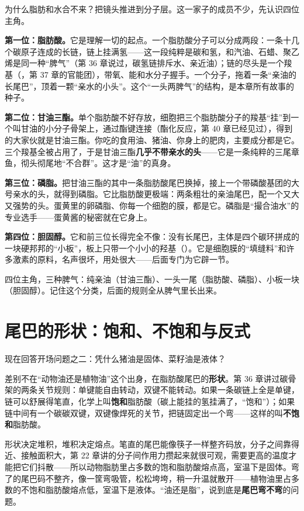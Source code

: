 为什么脂肪和水合不来？把镜头推进到分子层。这一家子的成员不少，先认识四位主角。

\textbf{第一位：脂肪酸。}它是理解一切的起点。一个脂肪酸分子可以分成两段：一条十几个碳原子连成的长链，链上挂满氢——这一段纯粹是碳和氢，和汽油、石蜡、聚乙烯是同一种“脾气”（第 36 章说过，碳氢链排斥水、亲近油）；链的尽头是一个羧基（，第 37 章的官能团），带氧、能和水分子握手。一个分子，拖着一条“亲油的长尾巴”，顶着一颗“亲水的小头”。这个“一头两脾气”的结构，是本章所有故事的种子。

\textbf{第二位：甘油三酯。}单个脂肪酸不好存放，细胞把三个脂肪酸分子的羧基“挂”到一个叫甘油的小分子骨架上，通过酯键连接（酯化反应，第 40 章已经见过），得到的大家伙就是甘油三酯。你吃的食用油、猪油、你身上的肥肉，主要成分都是它。三个羧基全被占用了，于是甘油三酯\textbf{几乎不带亲水的头}——它是一条纯粹的三尾章鱼，彻头彻尾地“不合群”。这才是“油”的真身。

\textbf{第三位：磷脂。}把甘油三酯的其中一条脂肪酸尾巴换掉，接上一个带磷酸基团的大号亲水的头，就得到磷脂。它比脂肪酸更极端：两条粗壮的亲油尾巴，配一个又大又强势的头。蛋黄里的卵磷脂、你每一个细胞的膜，都是它。磷脂是“撮合油水”的专业选手——蛋黄酱的秘密就在它身上。

\textbf{第四位：胆固醇。}它和前三位长得完全不像：没有长尾巴，主体是四个碳环拼成的一块硬邦邦的“小板”，板上只带一个小小的羟基（）。它是细胞膜的“填缝料”和许多激素的原料，名声很坏，用处很大——后面专门为它辟一节。

四位主角，三种脾气：纯亲油（甘油三酯）、一头一尾（脂肪酸、磷脂）、小板一块（胆固醇）。记住这个分类，后面的规则全从脾气里长出来。

\section{尾巴的形状：饱和、不饱和与反式}

现在回答开场问题之二：凭什么猪油是固体、菜籽油是液体？

差别不在“动物油还是植物油”这个出身，在脂肪酸尾巴的\textbf{形状}。第 36 章讲过碳骨架的两条关节规则：单键能自由转动，双键不能转动。如果一条碳链上全是单键，链可以舒展得笔直，化学上叫\textbf{饱和}脂肪酸（碳上能挂的氢挂满了，“饱和”）；如果链中间有一个碳碳双键，双键像焊死的关节，把链固定出一个弯——这样的叫\textbf{不饱和}脂肪酸。

形状决定堆积，堆积决定熔点。笔直的尾巴能像筷子一样整齐码放，分子之间靠得近、接触面积大，第 22 章讲的分子间作用力攒起来就很可观，需要更高的温度才能把它们抖散——所以动物脂肪里占多数的饱和脂肪酸熔点高，室温下是固体。弯了的尾巴码不整齐，像一筐弯吸管，松松垮垮，稍一升温就散开——植物油里占多数的不饱和脂肪酸熔点低，室温下是液体。“油还是脂”，说到底是\textbf{尾巴弯不弯}的问题。

